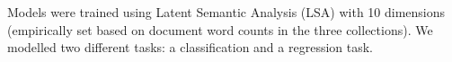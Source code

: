 Models were trained using Latent Semantic Analysis (LSA) with 10 dimensions (empirically set based on document word counts in the three collections).
We modelled two different tasks: a classification and a regression task. 






